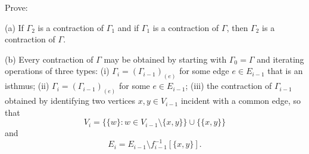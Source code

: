 Prove:

(a) If $\Gamma_2$ is a contraction of $\Gamma_1$ and if $\Gamma_1$ is a contraction of $\Gamma$, then $\Gamma_2$ is a contraction of $\Gamma$.

(b) Every contraction of $\Gamma$ may be obtained by starting with $\Gamma_0 = \Gamma$ and iterating operations of three types: (i) $\Gamma_i = (\Gamma_{i-1})_{(e)}$ for some edge $e \in E_{i-1}$ that is an isthmus; (ii) $\Gamma_i = (\Gamma_{i-1})_{(e)}$ for some $e \in E_{i-1}$; (iii) the contraction of $\Gamma_{i-1}$ obtained by identifying two vertices $x, y \in V_{i-1}$ incident with a common edge, so that
$$V_i = \{ \{w\} : w \in V_{i-1} \setminus \{x, y\} \} \cup \{ \{x, y\} \}$$
and
$$E_i = E_{i-1} \setminus f_{i-1}^{-1}[\{x, y\}].$$

